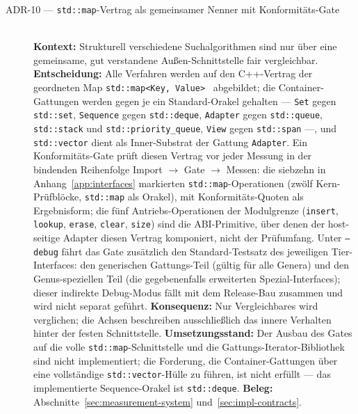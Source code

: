 \begin{description}
  \item[ADR-10 --- \texttt{std::map}-Vertrag als gemeinsamer Nenner mit Konformitäts-Gate]\hfill\\
  \textbf{Kontext:} Strukturell verschiedene Suchalgorithmen sind nur über eine gemeinsame, gut
  verstandene Außen-Schnittstelle fair vergleichbar.
  \textbf{Entscheidung:} Alle Verfahren werden auf den C++-Vertrag der geordneten Map
  \texttt{std::map<Key,\,Value>}~\cite{iso_cpp} abgebildet; die Container-Gattungen werden gegen je ein
  Standard-Orakel gehalten --- \texttt{Set} gegen \texttt{std::set}, \texttt{Sequence} gegen
  \texttt{std::deque}, \texttt{Adapter} gegen \texttt{std::queue}, \texttt{std::stack} und
  \texttt{std::priority\_queue}, \texttt{View} gegen \texttt{std::span} ---, und \texttt{std::vector}
  dient als Inner-Substrat der Gattung \texttt{Adapter}. Ein Konformitäts-Gate prüft diesen Vertrag vor
  jeder Messung in der bindenden Reihenfolge Import $\to$ Gate $\to$ Messen: die siebzehn in
  Anhang~\ref{app:interfaces} markierten \texttt{std::map}-Operationen (zwölf Kern-Prüfblöcke,
  \texttt{std::map} als Orakel), mit Konformitäts-Quoten als Ergebnisform; die fünf Antriebs-Operationen
  der Modulgrenze (\texttt{insert}, \texttt{lookup}, \texttt{erase}, \texttt{clear}, \texttt{size}) sind
  die ABI-Primitive, über denen der host-seitige Adapter diesen Vertrag komponiert, nicht der
  Prüfumfang. Unter \texttt{--debug} fährt das Gate zusätzlich den Standard-Testsatz des jeweiligen
  Tier-Interfaces: den generischen Gattungs-Teil (gültig für alle Genera) und den Genus-speziellen Teil
  (die gegebenenfalls erweiterten Spezial-Interfaces); dieser indirekte Debug-Modus fällt mit dem
  Release-Bau zusammen und wird nicht separat geführt.
  \textbf{Konsequenz:} Nur Vergleichbares wird verglichen; die Achsen beschreiben ausschließlich
  das innere Verhalten hinter der festen Schnittstelle.
  \textbf{Umsetzungsstand:} Der Ausbau des Gates auf die volle \texttt{std::map}-Schnittstelle und die
  Gattungs-Iterator-Bibliothek sind nicht implementiert; die Forderung, die Container-Gattungen über eine
  vollständige \texttt{std::vector}-Hülle zu führen, ist nicht erfüllt --- das implementierte Sequence-Orakel ist
  \texttt{std::deque}.
  \textbf{Beleg:} Abschnitte~\ref{sec:measurement-system} und~\ref{sec:impl-contracts}.


\end{description}
